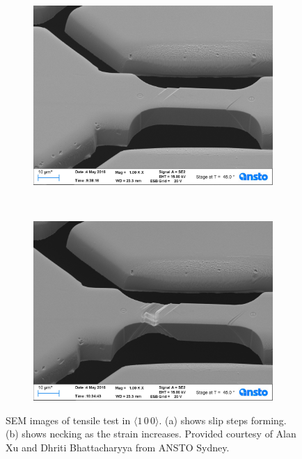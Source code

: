 \begin{figure}
    \centering
    \begin{subfigure}[t]{0.45\linewidth}
        \centering
        \includegraphics[width=\linewidth]{../data/Ni016.jpg}
        \caption{}
    \end{subfigure}
    ~
    \begin{subfigure}[t]{0.45\linewidth}
        \centering
        \includegraphics[width=\linewidth]{../data/Ni023.jpg}
        \caption{}
        \label{sf:necking}
    \end{subfigure}
    \caption[SEM images of tensile test in $\langle 1\, 0\, 0 \rangle$.]{SEM images of tensile test in $\langle 1\, 0\, 0 \rangle$. (a) shows slip steps forming. (b) shows necking as the strain increases. Provided courtesy of Alan Xu and Dhriti Bhattacharyya from ANSTO Sydney.}
    \label{f:Ni100_disp}
\end{figure}

